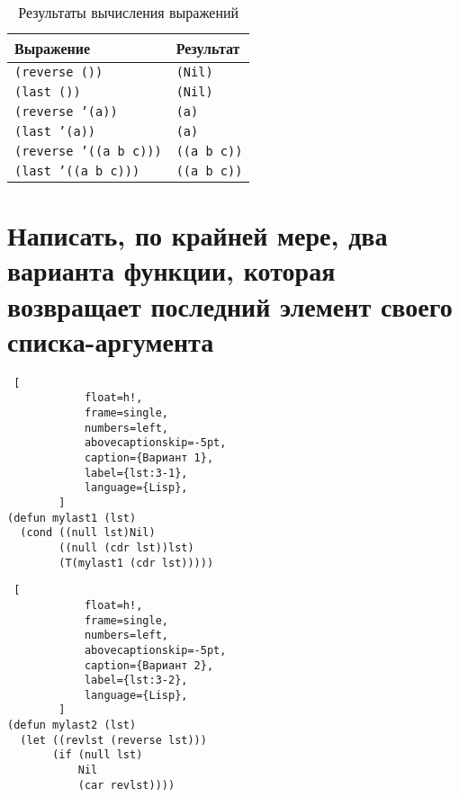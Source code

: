         \begin{table}[!ht]
            \begin{center}
                \caption{Результаты вычисления выражений}
                \label{tbl:2-1}
                \begin{tabular}{|l|l|}
                    \hline
                    \bfseries Выражение & \bfseries Результат\\\hline
                    \texttt{(reverse ())} & \texttt{(Nil)}\\\hline
                    \texttt{(last ())} & \texttt{(Nil)}\\\hline
                    \texttt{(reverse '(a))} & \texttt{(a)}\\\hline
                    \texttt{(last '(a))} & \texttt{(a)}\\\hline
                    \texttt{(reverse '((a b c)))} & \texttt{((a b c))}\\\hline
                    \texttt{(last '((a b c)))} & \texttt{((a b c))}\\\hline
                \end{tabular}
            \end{center}
        \end{table}
    
    \section{Написать, по крайней мере, два варианта функции, которая возвращает последний элемент своего списка-аргумента}
    
        \begin{lstlisting} [
            float=h!,
            frame=single,
            numbers=left,
            abovecaptionskip=-5pt,
            caption={Вариант 1},
            label={lst:3-1},
            language={Lisp},
        ]
(defun mylast1 (lst)
  (cond ((null lst)Nil)
        ((null (cdr lst))lst)
        (T(mylast1 (cdr lst)))))
        \end{lstlisting}
        
        \begin{lstlisting} [
            float=h!,
            frame=single,
            numbers=left,
            abovecaptionskip=-5pt,
            caption={Вариант 2},
            label={lst:3-2},
            language={Lisp},
        ]
(defun mylast2 (lst)
  (let ((revlst (reverse lst)))
       (if (null lst)
           Nil
           (car revlst))))
        \end{lstlisting}
    

